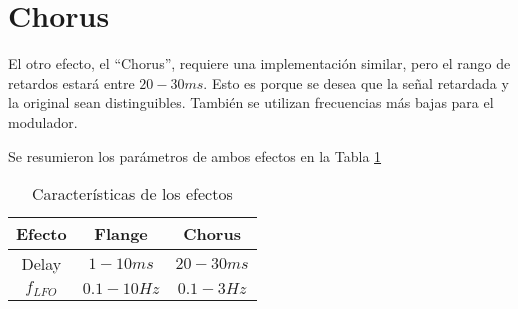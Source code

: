 \section{Chorus}

El otro efecto, el ``Chorus'', requiere una implementación similar, pero el rango de retardos estará entre $20-30 ms$. Esto es porque se desea que la señal retardada y la original sean distinguibles. También se utilizan frecuencias más bajas para el modulador.

Se resumieron los parámetros de ambos efectos en la Tabla \ref{tab:effects}

\begin{table}[ht]
    \begin{center}
        \begin{tabular}{|c|c|c|}
            \hline
            Efecto      &   Flange          &   Chorus      \\
            \hline
            Delay       &   $1-10 ms$       &   $20-30 ms$   \\
            $f_{LFO}$   &   $0.1 - 10 Hz$   &   $0.1-3Hz$  \\
            \hline
        \end{tabular}
        \caption{Características de los efectos}
        \label{tab:effects}
    \end{center}
\end{table}